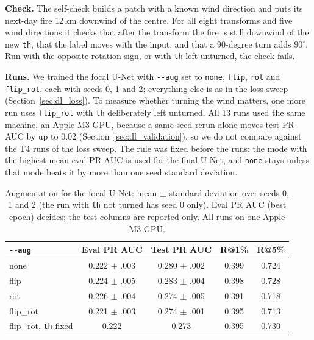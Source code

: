 \textbf{Check.} The self-check builds a patch with a known wind direction and puts its next-day fire 12\,km
downwind of the centre. For all eight transforms and five wind directions it checks that after the transform
the fire is still downwind of the new \texttt{th}, that the label moves with the input, and that a
90-degree turn adds $90^\circ$. Run with the opposite rotation sign, or with \texttt{th} left unturned, the
check fails.

\textbf{Runs.} We trained the focal U-Net with \texttt{-{}-aug} set to \texttt{none}, \texttt{flip},
\texttt{rot} and \texttt{flip\_rot}, each with seeds 0, 1 and 2; everything else is as in the loss sweep
(Section~\ref{sec:dl_loss}). To measure whether turning the wind matters, one more run uses
\texttt{flip\_rot} with \texttt{th} deliberately left unturned. All 13 runs used the same machine, an Apple
M3 GPU, because a same-seed rerun alone moves test PR AUC by up to 0.02 (Section~\ref{sec:dl_validation}),
so we do not compare against the T4 runs of the loss sweep. The rule was fixed before the runs: the mode with
the highest mean eval PR AUC is used for the final U-Net, and \texttt{none} stays unless that mode beats it
by more than one seed standard deviation.

\begin{table}[t]
\centering
\caption{Augmentation for the focal U-Net: mean $\pm$ standard deviation over seeds 0, 1 and 2 (the
run with \texttt{th} not turned has seed 0 only). Eval PR AUC (best epoch) decides; the test columns are
reported only. All runs on one Apple M3 GPU.}
\label{tab:dl_aug}
\footnotesize
\setlength{\tabcolsep}{2.6pt}
\renewcommand{\arraystretch}{1.12}
\begin{tabular}{lcccc}
\toprule
\rowcolor{tblhead}
\textbf{\texttt{-{}-aug}} & \textbf{Eval PR AUC} & \textbf{Test PR AUC} & \textbf{R@1\%} & \textbf{R@5\%} \\
\midrule
\rowcolor{tblours}
none & 0.222 $\pm$ .003 & 0.280 $\pm$ .002 & 0.399 & 0.724 \\
flip & 0.224 $\pm$ .005 & 0.283 $\pm$ .004 & 0.398 & 0.728 \\
rot & 0.226 $\pm$ .004 & 0.274 $\pm$ .005 & 0.391 & 0.718 \\
flip\_rot & 0.221 $\pm$ .003 & 0.274 $\pm$ .001 & 0.395 & 0.713 \\
\midrule
flip\_rot, \texttt{th} fixed & 0.222 & 0.273 & 0.395 & 0.730 \\
\bottomrule
\end{tabular}
\end{table}

